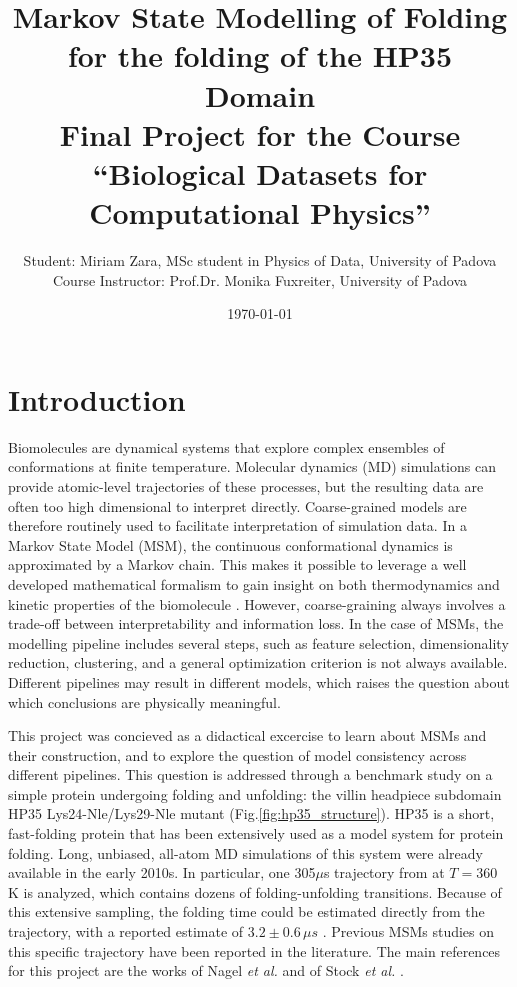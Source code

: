 \documentclass[prl,twocolumn]{revtex4-1}
\begin{document}
\title{
Markov State Modelling of Folding for the folding of the HP35 Domain\\
{\large Final Project for the Course ``Biological Datasets for Computational Physics''}
}
\author{Student: Miriam Zara, MSc student in Physics of Data, University of Padova \\
Course Instructor: Prof.Dr. Monika Fuxreiter, University of Padova \\
}
\date{\today}

\maketitle

\section{Introduction}
Biomolecules are dynamical systems that explore complex ensembles of conformations at finite temperature. Molecular dynamics (MD) simulations can provide atomic-level trajectories of these processes, but the resulting data are often too high dimensional to interpret directly. Coarse-grained models are therefore routinely used to facilitate interpretation of simulation data.
In a Markov State Model (MSM), the continuous conformational dynamics is approximated by a Markov chain. This makes it possible to leverage a well developed mathematical formalism 
to gain insight on both thermodynamics and kinetic properties of the biomolecule \cite{thebible}.
However, coarse-graining always involves a trade-off between interpretability and information loss. In the case of MSMs, the modelling pipeline includes several steps, such as feature selection, dimensionality reduction, clustering,  and a general optimization criterion is not always available. Different pipelines may result in different models, which raises
the question about which conclusions are physically meaningful.

This project was concieved as a didactical excercise to learn about MSMs and their construction, and to explore the question of model consistency across different pipelines.
This question is addressed through a benchmark study on a simple protein undergoing folding and unfolding: the villin headpiece subdomain HP35 Lys24-Nle/Lys29-Nle mutant (Fig.\ref{fig:hp35_structure}). 
HP35 is a short, fast-folding protein that has been extensively used as a model system for protein folding. Long, unbiased, all-atom MD simulations of this system were already available in the early 2010s. In particular, one 305$\mu$s trajectory from \cite{Lindorff-Larsen2011}  at $T = 360$ K is analyzed, 
which contains dozens of folding-unfolding transitions. Because of this extensive sampling, the folding time could be estimated directly from the trajectory, with a reported estimate of $3.2\pm0.6\,\mu s$ \cite{Piana2012}. 
Previous MSMs studies on this specific trajectory have been reported in the literature. The main references for this project are the works of Nagel \textit{et al.} \cite{selecting_features} and of Stock \textit{et al.} \cite{hierarchical_hp35}. 
\end{document}

